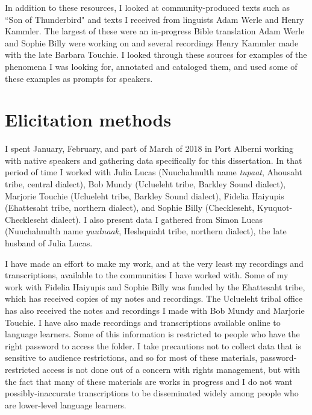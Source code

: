 In addition to these resources, I looked at community-produced texts such as ``Son of Thunderbird" and texts I received from linguists Adam Werle and Henry Kammler. The largest of these were an in-progress Bible translation Adam Werle and Sophie Billy were working on and several recordings Henry Kammler made with the late Barbara Touchie. I looked through these sources for examples of the phenomena I was looking for, annotated and cataloged them, and used some of these examples as prompts for speakers.

\section{Elicitation methods} \label{sec:method:elicitation}

I spent January, February, and part of March of 2018 in Port Alberni working with native speakers and gathering data specifically for this dissertation. In that period of time I worked with Julia Lucas (Nuuchahnulth name \textit{tupaat}, Ahousaht tribe, central dialect), Bob Mundy (Uclueleht tribe, Barkley Sound dialect), Marjorie Touchie (Uclueleht tribe, Barkley Sound dialect), Fidelia Haiyupis (Ehattesaht tribe, northern dialect), and Sophie Billy (Checkleseht, Kyuquot-Checkleseht dialect). I also present data I gathered from Simon Lucas (Nuuchahnulth name \textit{yuułnaak}, Heshquiaht tribe, northern dialect), the late husband of Julia Lucas.

I have made an effort to make my work, and at the very least my recordings and transcriptions, available to the communities I have worked with. Some of my work with Fidelia Haiyupis and Sophie Billy was funded by the Ehattesaht tribe, which has received copies of my notes and recordings. The Uclueleht tribal office has also received the notes and recordings I made with Bob Mundy and Marjorie Touchie. I have also made recordings and transcriptions available online to language learners. Some of this information is restricted to people who have the right password to access the folder. I take precautions not to collect data that is sensitive to audience restrictions, and so for most of these materials, password-restricted access is not done out of a concern with rights management, but with the fact that many of these materials are works in progress and I do not want possibly-inaccurate transcriptions to be disseminated widely among people who are lower-level language learners.

